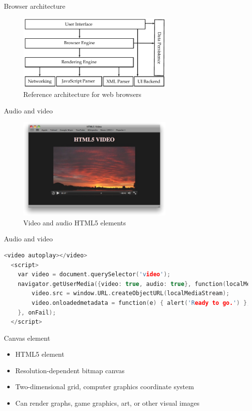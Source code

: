 \documentclass{beamer}
\begin{document}
\begin{frame}{Browser architecture}
  \begin{figure}[!htb]
    \centering
    \includegraphics[width=220pt]{../chapters/basic_concepts/web_architecture.pdf}
    \caption{Reference architecture for web browsers}
    \label{figure:web_architecture}
  \end{figure}
\end{frame}
\begin{frame}{Audio and video}
  \begin{figure}[!htb]
    \centering
    \includegraphics[width=220pt]{../chapters/basic_concepts/html5_audio_video.png}
    \caption{Video and audio HTML5 elements}
    \label{figure:html5_audio_video}
  \end{figure}
\end{frame}
\begin{frame}[fragile]{Audio and video}
\begin{lstlisting}[language=C++,label={lst:get_user_media},caption=Capturing browser microphone and camera]
  <video autoplay></video>
  <script>
    var video = document.querySelector('video');
    navigator.getUserMedia({video: true, audio: true}, function(localMediaStream) {
        video.src = window.URL.createObjectURL(localMediaStream);
        video.onloadedmetadata = function(e) { alert('Ready to go.') };
    }, onFail);
  </script>
  \end{lstlisting}
\end{frame}
\begin{frame}{Canvas element}
  \begin{itemize}
    \item HTML5 element
    \item Resolution-dependent bitmap canvas
    \item Two-dimensional grid, computer graphics coordinate system
    \item Can render graphs, game graphics, art, or other visual images
  \end{itemize}
\end{frame}
\end{document}
